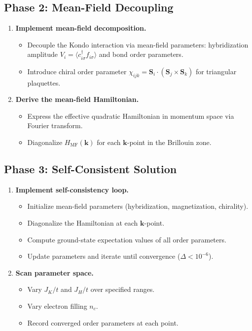 \documentclass[11pt,a4paper]{article}
\begin{document}
\subsection{Phase 2: Mean-Field Decoupling}
\begin{enumerate}[label=\textbf{2.\arabic*}]
  \item \textbf{Implement mean-field decomposition.}
    \begin{itemize}
      \item Decouple the Kondo interaction via mean-field parameters: hybridization amplitude $V_i = \langle c^\dagger_{i\sigma} f_{i\sigma} \rangle$ and bond order parameters.
      \item Introduce chiral order parameter $\chi_{ijk} = \mathbf{S}_i \cdot (\mathbf{S}_j \times \mathbf{S}_k)$ for triangular plaquettes.
    \end{itemize}
  \item \textbf{Derive the mean-field Hamiltonian.}
    \begin{itemize}
      \item Express the effective quadratic Hamiltonian in momentum space via Fourier transform.
      \item Diagonalize $H_{\text{MF}}(\mathbf{k})$ for each $\mathbf{k}$-point in the Brillouin zone.
    \end{itemize}
\end{enumerate}

\subsection{Phase 3: Self-Consistent Solution}
\begin{enumerate}[label=\textbf{3.\arabic*}]
  \item \textbf{Implement self-consistency loop.}
    \begin{itemize}
      \item Initialize mean-field parameters (hybridization, magnetization, chirality).
      \item Diagonalize the Hamiltonian at each $\mathbf{k}$-point.
      \item Compute ground-state expectation values of all order parameters.
      \item Update parameters and iterate until convergence ($\Delta < 10^{-6}$).
    \end{itemize}
  \item \textbf{Scan parameter space.}
    \begin{itemize}
      \item Vary $J_K/t$ and $J_H/t$ over specified ranges.
      \item Vary electron filling $n_c$.
      \item Record converged order parameters at each point.
    \end{itemize}
\end{enumerate}
\end{document}
